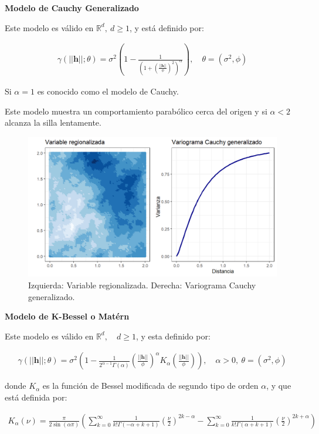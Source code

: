 \documentclass[
]{book}
\begin{document}
\textbf{Modelo de Cauchy Generalizado}

Este modelo es válido en \(\mathbb{R}^d,\ d\geq1\), y está definido por:

\begin{align}
    \gamma(||\textbf{h}||;\theta)=\sigma^2\left(1-\frac{1}{\left(1+\left( \frac{||\textbf{h}||}{\phi} \right)^2\right)^\alpha} \right), \quad \theta=(\sigma^2,\phi)
\end{align}

Si \(\alpha=1\) es conocido como el modelo de Cauchy.

Este modelo muestra un comportamiento parabólico cerca del origen y si \(\alpha<2\) alcanza la silla lentamente.

\begin{figure}
\includegraphics[width=17.78in]{figuras/otros/caugen_var} \caption{Izquierda: Variable regionalizada. Derecha: Variograma Cauchy generalizado.}\label{fig:caugenvar}
\end{figure}

\textbf{Modelo de K-Bessel o Matérn}

Este modelo es válido en \(\mathbb{R}^d,\quad d \geq 1\), y esta definido por:

\begin{align}
    \gamma(||\textbf{h}||;\theta)=\sigma^2\left(1-\frac{1}{2^{\alpha-1}\Gamma(\alpha)}\left(\frac{||\textbf{h}||}{\phi} \right)^\alpha K_\alpha \left(\frac{||\textbf{h}||}{\phi} \right) \right),\quad \alpha>0,\ \theta=(\sigma^2,\phi)
\end{align}

donde \(K_\alpha\) es la función de Bessel modificada de segundo tipo de orden \(\alpha\), y que está definida por:

\begin{align}
    K_\alpha (\nu) =\frac{\pi}{2\sin(\alpha \pi)}\left(\sum_{k=0}^\infty {\frac{1}{k!\Gamma(-\alpha+k+1)}\left(\frac{\nu}{2}\right)^{2k-\alpha}}-\sum_{k=0}^\infty {\frac{1}{k!\Gamma(\alpha+k+1)}\left(\frac{\nu}{2}\right)^{2k+\alpha}}\right)
\end{align}
\end{document}
